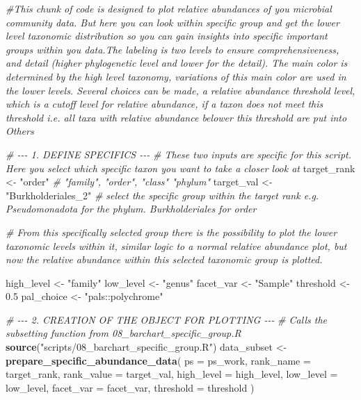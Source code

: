\documentclass[
]{article}
\newenvironment{Shaded}{\begin{snugshade}}{\end{snugshade}}
\newcommand{\AttributeTok}[1]{\textcolor[rgb]{0.13,0.29,0.53}{#1}}
\newcommand{\CommentTok}[1]{\textcolor[rgb]{0.56,0.35,0.01}{\textit{#1}}}
\newcommand{\FloatTok}[1]{\textcolor[rgb]{0.00,0.00,0.81}{#1}}
\newcommand{\FunctionTok}[1]{\textcolor[rgb]{0.13,0.29,0.53}{\textbf{#1}}}
\newcommand{\NormalTok}[1]{#1}
\newcommand{\OtherTok}[1]{\textcolor[rgb]{0.56,0.35,0.01}{#1}}
\newcommand{\StringTok}[1]{\textcolor[rgb]{0.31,0.60,0.02}{#1}}
\begin{document}
\begin{Shaded}
\begin{Highlighting}[]
\CommentTok{\#This chunk of code is designed to plot relative abundances of you microbial community data. But here you can look within specific group and get the lower level taxonomic distribution so you can gain insights into specific important groups within you data.The labeling is two levels to ensure comprehensiveness, and detail (higher phylogenetic level and lower for the detail). The main color is determined by the high level taxonomy, variations of this main color are used in the lower levels. Several choices can be made, a relative abundance threshold level, which is a cutoff level for relative abundance, if a taxon does not meet this threshold i.e. all taxa with relative abundance belower this threshold are put into \textquotesingle{}Others\textquotesingle{} }

\CommentTok{\# {-}{-}{-} 1. DEFINE SPECIFICS {-}{-}{-}}
\CommentTok{\# These two inputs are specific for this script. Here you select which specific taxon you want to take a closer look at}
\NormalTok{target\_rank }\OtherTok{\textless{}{-}} \StringTok{"order"} \CommentTok{\# "family", "order", "class" "phylum"}
\NormalTok{target\_val  }\OtherTok{\textless{}{-}} \StringTok{"Burkholderiales\_2"} \CommentTok{\# select the specific group within the target rank e.g. Pseudomonadota for the phylum. Burkholderiales for order}

\CommentTok{\# From this specifically selected group there is the possibility to plot the lower taxonomic levels within it, similar logic to a normal relative abundance plot, but now the relative abundance within this selected taxonomic group is plotted.}

\NormalTok{high\_level  }\OtherTok{\textless{}{-}} \StringTok{"family"}
\NormalTok{low\_level   }\OtherTok{\textless{}{-}} \StringTok{"genus"}
\NormalTok{facet\_var   }\OtherTok{\textless{}{-}} \StringTok{"Sample"}
\NormalTok{threshold   }\OtherTok{\textless{}{-}} \FloatTok{0.5} 
\NormalTok{pal\_choice  }\OtherTok{\textless{}{-}} \StringTok{"pals::polychrome"}

\CommentTok{\# {-}{-}{-} 2. CREATION OF THE OBJECT FOR PLOTTING {-}{-}{-}}
\CommentTok{\# Calls the subsetting function from 08\_barchart\_specific\_group.R}
\FunctionTok{source}\NormalTok{(}\StringTok{"scripts/08\_barchart\_specific\_group.R"}\NormalTok{)}
\NormalTok{data\_subset }\OtherTok{\textless{}{-}} \FunctionTok{prepare\_specific\_abundance\_data}\NormalTok{(}
  \AttributeTok{ps         =}\NormalTok{ ps\_work,}
  \AttributeTok{rank\_name  =}\NormalTok{ target\_rank,}
  \AttributeTok{rank\_value =}\NormalTok{ target\_val,}
  \AttributeTok{high\_level =}\NormalTok{ high\_level,}
  \AttributeTok{low\_level  =}\NormalTok{ low\_level,}
  \AttributeTok{facet\_var  =}\NormalTok{ facet\_var,}
  \AttributeTok{threshold  =}\NormalTok{ threshold}
\NormalTok{)}


\end{Highlighting}
\end{Shaded}
\end{document}
